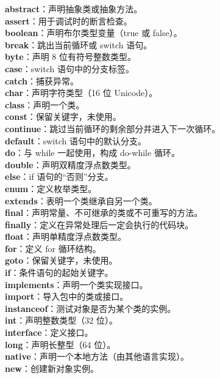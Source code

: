 \documentclass[12pt,a4paper]{article}
\begin{document}
\noindent
\textbf{abstract}：声明抽象类或抽象方法。\\
\textbf{assert}：用于调试时的断言检查。\\
\textbf{boolean}：声明布尔类型变量（true 或 false）。\\
\textbf{break}：跳出当前循环或 switch 语句。\\
\textbf{byte}：声明 8 位有符号整数类型。\\
\textbf{case}：switch 语句中的分支标签。\\
\textbf{catch}：捕获异常。\\
\textbf{char}：声明字符类型（16 位 Unicode）。\\
\textbf{class}：声明一个类。\\
\textbf{const}：保留关键字，未使用。\\
\textbf{continue}：跳过当前循环的剩余部分并进入下一次循环。\\
\textbf{default}：switch 语句中的默认分支。\\
\textbf{do}：与 while 一起使用，构成 do-while 循环。\\
\textbf{double}：声明双精度浮点数类型。\\
\textbf{else}：if 语句的“否则”分支。\\
\textbf{enum}：定义枚举类型。\\
\textbf{extends}：表明一个类继承自另一个类。\\
\textbf{final}：声明常量、不可继承的类或不可重写的方法。\\
\textbf{finally}：定义在异常处理后一定会执行的代码块。\\
\textbf{float}：声明单精度浮点数类型。\\
\textbf{for}：定义 for 循环结构。\\
\textbf{goto}：保留关键字，未使用。\\
\textbf{if}：条件语句的起始关键字。\\
\textbf{implements}：声明一个类实现接口。\\
\textbf{import}：导入包中的类或接口。\\
\textbf{instanceof}：测试对象是否为某个类的实例。\\
\textbf{int}：声明整数类型（32 位）。\\
\textbf{interface}：定义接口。\\
\textbf{long}：声明长整型（64 位）。\\
\textbf{native}：声明一个本地方法（由其他语言实现）。\\
\textbf{new}：创建新对象实例。\\
\end{document}
